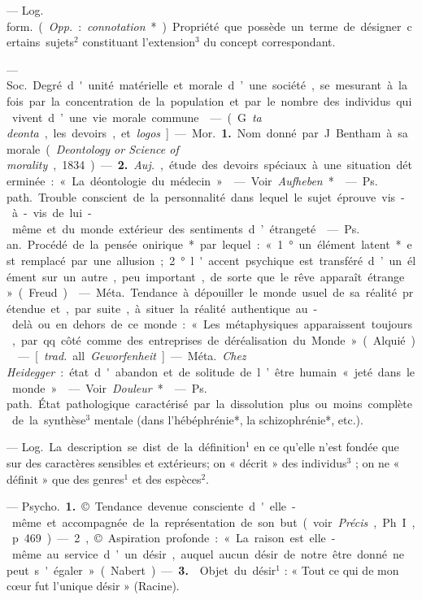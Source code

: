 \begin{itemize}[leftmargin=1cm, label=, itemsep=1pt]
 — \si{Log. form.} ({\it Opp.} : {\it connotation}*). 
Propriété que possède un terme de désigner certains sujets$^2$
constituant l'extension$^3$ du concept correspondant.

 — \si{Soc.} Degré d'unité
matérielle et morale d’une société,
se mesurant à la fois par la concentration de la population et par le
nombre des individus qui vivent
d’une vie morale commune.

 — (G. {\it ta deonta}, les devoirs,
et {\it logos}] — \si{Mor.} {\bf 1.} Nom donné par
J. Bentham à sa morale ({\it Deontology
or Science of morality}, 1834). —
 {\bf 2.} {\it Auj.}, étude des devoirs spéciaux
à une situation déterminée : « La
déontologie du médecin ».

 — Voir {\it Aufheben}*.

 — \si{Ps. path.}
Trouble conscient de la personnalité
dans lequel le sujet éprouve vis-à-vis
de lui-même et du monde extérieur
des sentiments d’étrangeté.

 — \si{Ps. an.} Procédé de la
pensée onirique* par lequel : « 1° un
élément latent* est remplacé par
une allusion ; 2° l'accent psychique
est transféré d’un élément sur un
autre, peu important, de sorte que
le rêve apparaît étrange » (Freud).

 — \si{Méta.} Tendance à
dépouiller le monde usuel de sa
réalité prétendue et, par suite, à
situer la réalité authentique au-delà ou en dehors de ce monde :
« Les métaphysiques apparaissent
toujours, par qq. côté comme des
entreprises de déréalisation du
Monde » (Alquié).

 — [{\it trad.} all. {\it Geworfenheit}] —
\si{Méta.} {\it Chez Heidegger} : état d'abandon
et de solitude de l’être humain « jeté
dans le monde ».

 — Voir {\it Douleur}*.

 — \si{Ps. path.}
État pathologique caractérisé par la
dissolution plus ou moins complète
de la synthèse$^3$ mentale (dans
l'hébéphrénie*, la schizophrénie*,
etc.).

 — \si{Log.} La description
se dist. de la définition$^1$ en ce qu’elle
n’est fondée que sur des caractères
sensibles et extérieurs; on « décrit »
des individus$^3$ ; on ne « définit » que
des genres$^1$ et des espèces$^2$.

 — \si{Psycho.} {\bf 1.} © Tendance devenue consciente d'elle-même et
accompagnée de la représentation
de son but (voir  {\it Précis}, Ph. I, p. 469).
— 2, © Aspiration profonde : « La
raison est elle-même au service d’un
désir, auquel aucun désir de notre
être donné ne peut s'égaler » (Nabert). — {\bf 3.}  Objet du désir$^1$ : « Tout
ce qui de mon cœur fut l’unique
désir » (Racine).


\end{itemize}
